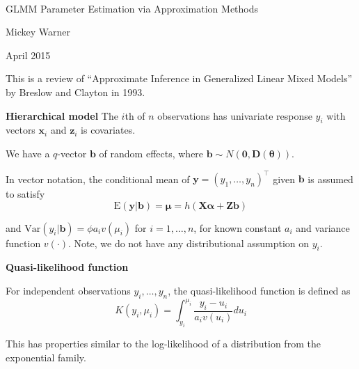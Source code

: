 \documentclass[mathserif, 11pt, t]{beamer}
\newcommand{\E}{\mathrm{E}}
\newcommand{\Var}{\mathrm{Var}}
\newcommand{\m}[1]{\mathbf{\bm{#1}}}
\renewcommand{\subtitle}[1]{\vspace{0.45cm}\textcolor{bluegreen}{
    {\textbf{#1}}}\vspace{0.15cm}\newline}
\begin{document}
\begin{center}
\ \\ [-0.5in]
\vfill
\bigskip
\bigskip
\bigskip
\bigskip
\bigskip

\begin{LARGE}
\begin{center}
GLMM Parameter Estimation via Approximation Methods
\end{center}
\end{LARGE}
\vfill

\begin{center}
Mickey Warner
\end{center}
\vfill
April 2015
\bigskip
\bigskip
\bigskip
\vfill
\ \\ [-0.5in]
\end{center}

\begin{frame}
\subtitle{}
This is a review of ``Approximate Inference in Generalized Linear Mixed Models'' by Breslow and Clayton in 1993.

\end{frame}

\begin{frame}
\subtitle{Hierarchical model}
The $i$th of $n$ observations has univariate response $y_i$ with vectors $\m{x}_i$ and $\m{z}_i$ is covariates.
\bigskip

We have a $q$-vector $\m{b}$ of random effects, where $\m{b}\sim N(\m{0},\m{D}(\m{\theta}))$.
\bigskip

In vector notation, the conditional mean of $\m{y}=(y_1,\ldots,y_n)^\top$ given $\m{b}$ is assumed to satisfy
\[ \E(\m{y}|\m{b}) = \m{\mu} = h(\m{X}\m{\alpha} + \m{Z}\m{b}) \]

and $\Var(y_i|\m{b})=\phi a_iv(\mu_i)$ for $i=1,\ldots,n$, for known constant $a_i$ and variance function $v(\cdot)$. Note, we do not have any distributional assumption on $y_i$.

\end{frame}

\begin{frame}
\subtitle{Quasi-likelihood function}

For independent observations $y_i,\ldots,y_n$, the quasi-likelihood function is defined as
\[ K(y_i,\mu_i)=\int_{y_i}^{\mu_i}\frac{y_i-u_i}{a_i v(u_i)}du_i \]

This has properties similar to the log-likelihood of a distribution from the exponential family.


\end{frame}
\end{document}
